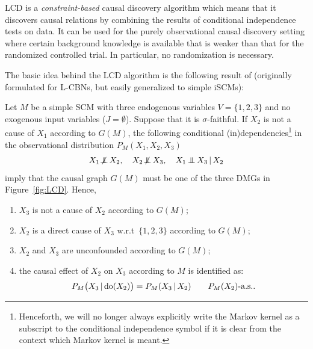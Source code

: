 LCD is a \emph{constraint-based} causal discovery algorithm which means that it discovers
causal relations by combining the results of conditional independence tests on data.
It can be used for the purely observational causal discovery setting where certain background knowledge is available
that is weaker than that for the randomized controlled trial. In particular, no randomization is necessary.

The basic idea behind the LCD algorithm is the following result of \cite{Cooper1997}
(originally formulated for L-CBNs, but easily generalized to simple iSCMs):
\begin{Prp}\label{prp:LCD}
  Let $M$ be a simple SCM with three endogenous variables $V = \{1,2,3\}$ and no exogenous input variables ($J = \emptyset$).
  Suppose that it is $\sigma$-faithful. 
  If $X_2$ is not a cause of $X_1$ according to $G(M)$,
  the following conditional (in)dependencies\footnote{Henceforth, we will no longer always explicitly write
  the Markov kernel as a subscript to the conditional independence symbol if it is clear
  from the context which Markov kernel is meant.} in the observational distribution $P_{M}(X_1,X_2,X_3)$
  $$X_1 \nIndep X_2, \quad X_2 \nIndep X_3, \quad X_1 \Indep X_3 \given X_2$$
  imply that the causal graph $G(M)$ must be one of the three DMGs in Figure~\ref{fig:LCD}. 
  Hence,
  \begin{enumerate}
  \item $X_3$ is not a cause of $X_2$ according to $G(M)$;
  \item $X_2$ is a direct cause of $X_3$ w.r.t\ $\{1,2,3\}$ according to $G(M)$;
  \item $X_2$ and $X_3$ are unconfounded according to $G(M)$;
  \item the causal effect of $X_2$ on $X_3$ according to $M$ is identified as:
    \begin{equation}\label{eq:LCD}
      P_{M}\big(X_3 \operatorname*{|} \operatorname{do}(X_2)\big) = P_{M}(X_3 \operatorname*{|} X_2) \qquad P_M(X_2)\text{-a.s.}.
    \end{equation}
  \end{enumerate}
\end{Prp}
